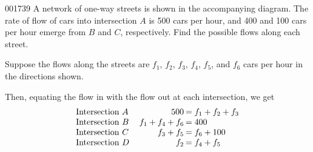 \begin{example}{}{001739}
A network of one-way streets is shown in the accompanying diagram. The rate of flow of cars into intersection $A$ is 500 cars per hour, and 400 and 100 cars per hour emerge from $B$ and $C$, respectively. Find the possible flows along each street.

\setlength{\rightskip}{0pt plus 200pt}
\begin{solution}
Suppose the flows along the streets are $ f_1$, $f_2$, $f_3$, $f_4$, $f_5$, and $f_6$ cars per hour in the directions shown. 

\newpage

Then, equating the flow in with the flow out at each intersection, we get
\begin{equation*}
\arraycolsep=1pt
\begin{array}{lrl}
	\mbox{Intersection } A & 500 					& = f_1 + f_2 + f_3 \\
	\mbox{Intersection } B & \quad f_1 + f_4 + f_6 	& = 400 \\
	\mbox{Intersection } C & f_3 + f_5 				& = f_6 + 100 \\
	\mbox{Intersection } D & f_2					& = f_4 + f_5 \\
\end{array}
\end{equation*}




\end{solution}
\end{example}
